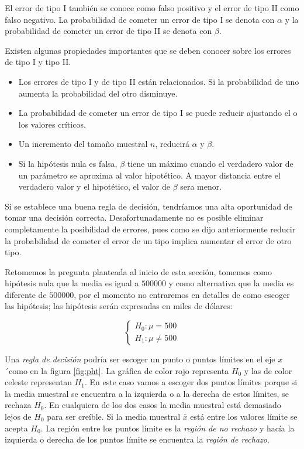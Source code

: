 \documentclass[]{book}
\providecommand{\tightlist}{%
  \setlength{\itemsep}{0pt}\setlength{\parskip}{0pt}}
\begin{document}
El error de tipo I también se conoce como falso positivo y el error de
tipo II como falso negativo. La probabilidad de cometer un error de tipo
I se denota con \(\alpha\) y la probabilidad de cometer un error de tipo
II se denota con \(\beta\).

Existen algunas propiedades importantes que se deben conocer sobre los
errores de tipo I y tipo II.

\begin{itemize}
\tightlist
\item
  Los errores de tipo I y de tipo II están relacionados. Si la
  probabilidad de uno aumenta la probabilidad del otro disminuye.
\item
  La probabilidad de cometer un error de tipo I se puede reducir
  ajustando el o los valores críticos.
\item
  Un incremento del tamaño muestral \(n\), reducirá \(\alpha\) y
  \(\beta\).
\item
  Si la hipótesis nula es falsa, \(\beta\) tiene un máximo cuando el
  verdadero valor de un parámetro se aproxima al valor hipotético. A
  mayor distancia entre el verdadero valor y el hipotético, el valor de
  \(\beta\) sera menor.
\end{itemize}

Si se establece una buena regla de decisión, tendríamos una alta
oportunidad de tomar una decisión correcta. Desafortunadamente no es
posible eliminar completamente la posibilidad de errores, pues como se
dijo anteriormente reducir la probabilidad de cometer el error de un
tipo implica aumentar el error de otro tipo.

Retomemos la pregunta planteada al inicio de esta sección, tomemos como
hipótesis nula que la media es igual a \(500000\) y como alternativa que
la media es diferente de \(500000\), por el momento no entraremos en
detalles de como escoger las hipótesis; las hipótesis serán expresadas
en miles de dólares:

\begin{equation} 
\begin{cases} 
H_0: \mu = 500 \\ 
H_1: \mu \neq 500
\end{cases} 
\end{equation}

Una \emph{regla de decisión} podría ser escoger un punto o puntos
límites en el eje \(x\)´como en la figura \ref{fig:pht}. La gráfica de
color rojo representa \(H_0\) y las de color celeste representan
\(H_1\). En este caso vamos a escoger dos puntos límites porque si la
media muestral se encuentra a la izquierda o a la derecha de estos
límites, se rechaza \(H_0\). En cualquiera de los dos casos la media
muestral está demasiado lejos de \(H_0\) para ser creíble. Si la media
muestral \(\bar{x}\) está entre los valores límite se acepta \(H_0\). La
región entre los puntos límite es la \emph{región de no rechazo} y hacía
la izquierda o derecha de los puntos límite se encuentra la \emph{región
de rechazo}.
\end{document}
